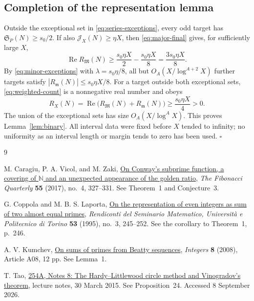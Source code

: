 \documentclass[11pt,letterpaper]{article}
\numberwithin{equation}{section}
\theoremstyle{remark}
\newcommand{\N}{\mathbb N}
\begin{document}
\subsection{Completion of the representation lemma}

Outside the exceptional set in \eqref{eq:series-exceptions}, every
odd target has $\mathfrak S_P(N)\ge s_0/2$. If also
$\mathcal J_X(N)\ge\eta X$, then \eqref{eq:major-final} gives,
for sufficiently large $X$,
\[
 \operatorname{Re}R_{\mathfrak M}(N)
 \ge\frac{s_0\eta X}{2}-\frac{s_0\eta X}{8}
 =\frac{3s_0\eta X}{8}.
\]
By \eqref{eq:minor-exceptions} with $\lambda=s_0\eta/8$,
all but $O_A(X/\log^{A+2}X)$ further targets satisfy
$|R_{\mathfrak m}(N)|\le s_0\eta X/8$. For a target outside
both exceptional sets, \eqref{eq:weighted-count} is a nonnegative
real number and obeys
\[
 R_X(N)=\operatorname{Re}
             \bigl(R_{\mathfrak M}(N)+R_{\mathfrak m}(N)\bigr)
 \ge\frac{s_0\eta X}{4}>0.
\]
The union of the exceptional sets has size $O_A(X/\log^A X)$.
This proves Lemma~\ref{lem:binary}. All interval data were fixed
before $X$ tended to infinity; no uniformity as an interval length
or margin tends to zero has been used. \hfill$\square$

\begin{thebibliography}{9}

M. Caragiu, P. A. Vicol, and M. Zaki,
\href{https://www.fq.math.ca/Papers1/55-4/CaragiuVicolZaki03162017.pdf}
{On Conway's subprime function, a covering of $\N$ and an unexpected
appearance of the golden ratio},
\emph{The Fibonacci Quarterly} \textbf{55} (2017), no.~4, 327--331.
See Theorem~1 and Conjecture~3.

G. Coppola and M. B. S. Laporta,
\href{https://www.giovannicoppola.name/files/articoli/8_giovanni_coppola_number_theory_seminar_politecnico_torino_245.pdf}
{On the representation of even integers as sum of two almost equal primes},
\emph{Rendiconti del Seminario Matematico, Universit\`a e Politecnico
di Torino} \textbf{53} (1995), no.~3, 245--252.
See the corollary to Theorem~1, p.~246.

A. V. Kumchev,
\href{https://tigerweb.towson.edu/akumchev/a23.pdf}
{On sums of primes from Beatty sequences},
\emph{Integers} \textbf{8} (2008), Article A08, 12 pp.
See Lemma~1.

T. Tao,
\href{https://terrytao.wordpress.com/2015/03/30/254a-notes-8-the-hardy-littlewood-circle-method-and-vinogradovs-theorem/}
{254A, Notes 8: The Hardy--Littlewood circle method and Vinogradov's theorem},
lecture notes, 30 March 2015.
See Proposition~24. Accessed 8 September 2026.

\end{thebibliography}
\end{document}
